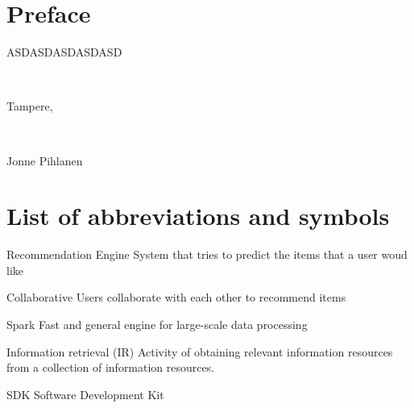 \documentclass[12pt,a4paper,english
]{tutthesis}
\begin{document}

\makeatother %


\chapter*{Preface}

ASDASDASDASDASD


~ 

Tampere, 

~


Jonne Pihlanen




%
%

\renewcommand\contentsname{Table of Contents} %
\setcounter{tocdepth}{3}                      %
\tableofcontents                              %



%
%

\chapter*{List of abbreviations and symbols}
\markboth{}{}                                %

\begin{termlist}
	\item [Recommendation Engine]	System that tries to predict the items that a user woud like
	\item [Collaborative]			Users collaborate with each other to recommend items
	\item [Spark] 					Fast and general engine for large-scale data processing
	\item [Information retrieval (IR)]	Activity of obtaining relevant information resources from a collection of information resources.
	\item [SDK] Software Development Kit
\end{termlist}
\end{document}
